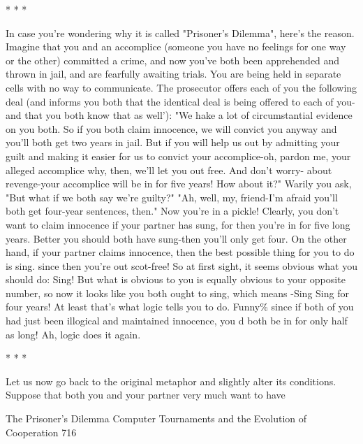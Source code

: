                                          *   *   *

In case you're wondering why it is called "Prisoner's Dilemma", here's the reason.
Imagine that you and an accomplice (someone you have no feelings for one way or the
other) committed a crime, and now you've both been apprehended and thrown in jail, and
are fearfully awaiting trials. You are being held in separate cells with no way to
communicate. The prosecutor offers each of you the following deal (and informs you
both that the identical deal is being offered to each of you-and that you both know that as
well'): "We hake a lot of circumstantial evidence on you both. So if you both claim
innocence, we will convict you anyway and you'll both get two years in jail. But if you
will help us out by admitting your guilt and making it easier for us to convict your
accomplice-oh, pardon me, your alleged accomplice why, then, we'll let you out free.
And don't worry- about revenge-your accomplice will be in for five years! How about
it?" Warily you ask, "But what if we both say we're guilty?" "Ah, well, my, friend-I'm
afraid you'll both get four-year sentences, then."
        Now you're in a pickle! Clearly, you don't want to claim innocence if your partner
has sung, for then you're in for five long years. Better you should both have sung-then
you'll only get four. On the other hand, if your partner claims innocence, then the best
possible thing for you to do is sing. since then you're out scot-free! So at first sight, it
seems obvious what you should do: Sing! But what is obvious to you is equally obvious
to your opposite number, so now it looks like you both ought to sing, which means -Sing
Sing for four years! At least that's what logic tells you to do. Funny\% since if both of you
had just been illogical and maintained innocence, you d both be in for only half as long!
Ah, logic does it again.

                                         *   *   *

Let us now go back to the original metaphor and slightly alter its conditions. Suppose that
both you and your partner very much want to have




The Prisoner's Dilemma Computer Tournaments and the Evolution of Cooperation            716

